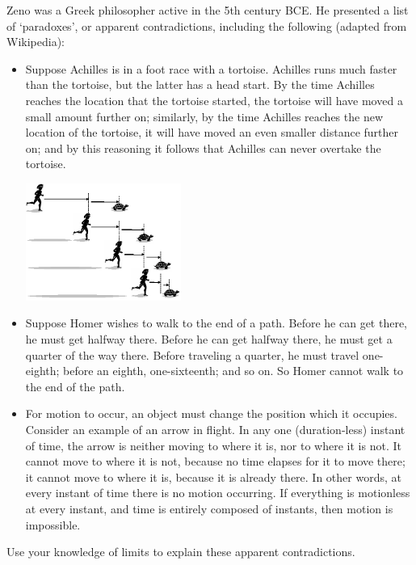 \begin{questions}
  \questioS Zeno was a Greek philosopher active in the 5th century BCE. He presented a list of `paradoxes', or apparent contradictions,
            including the following (adapted from Wikipedia):
            \begin{itemize}
              \item Suppose Achilles is in a foot race with a tortoise. Achilles runs much faster than the tortoise, but the latter
                    has a head start. By the time Achilles reaches the location that the tortoise started, the tortoise will have moved
                    a small amount further on; similarly, by the time Achilles reaches the new location of the tortoise, it will have moved
                    an even smaller distance further on; and by this reasoning it follows that Achilles can never overtake the tortoise.
                    \begin{center}
                      \includegraphics[width=0.4\textwidth]{achilles}
                    \end{center}
              \item Suppose Homer wishes to walk to the end of a path. Before he can get there, he must get halfway there. Before he can
                    get halfway there, he must get a quarter of the way there. Before traveling a quarter, he must travel one-eighth; before
                    an eighth, one-sixteenth; and so on. So Homer cannot walk to the end of the path.
              \item For motion to occur, an object must change the position which it occupies. Consider an example of an arrow in flight. In any
                    one (duration-less) instant of time, the arrow is neither moving to where it is, nor to where it is not. It cannot move to
                    where it is not, because no time elapses for it to move there; it cannot move to where it is, because it is already there.
                    In other words, at every instant of time there is no motion occurring. If everything is motionless at every instant, and
                    time is entirely composed of instants, then motion is impossible.
            \end{itemize}
            Use your knowledge of limits to explain these apparent contradictions.
\end{questions}

